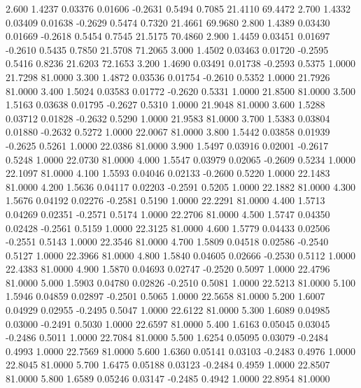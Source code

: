    2.600   1.4237   0.03376   0.01606  -0.2631   0.5494   0.7085  21.4110  69.4472
   2.700   1.4332   0.03409   0.01638  -0.2629   0.5474   0.7320  21.4661  69.9680
   2.800   1.4389   0.03430   0.01669  -0.2618   0.5454   0.7545  21.5175  70.4860
   2.900   1.4459   0.03451   0.01697  -0.2610   0.5435   0.7850  21.5708  71.2065
   3.000   1.4502   0.03463   0.01720  -0.2595   0.5416   0.8236  21.6203  72.1653
   3.200   1.4690   0.03491   0.01738  -0.2593   0.5375   1.0000  21.7298  81.0000
   3.300   1.4872   0.03536   0.01754  -0.2610   0.5352   1.0000  21.7926  81.0000
   3.400   1.5024   0.03583   0.01772  -0.2620   0.5331   1.0000  21.8500  81.0000
   3.500   1.5163   0.03638   0.01795  -0.2627   0.5310   1.0000  21.9048  81.0000
   3.600   1.5288   0.03712   0.01828  -0.2632   0.5290   1.0000  21.9583  81.0000
   3.700   1.5383   0.03804   0.01880  -0.2632   0.5272   1.0000  22.0067  81.0000
   3.800   1.5442   0.03858   0.01939  -0.2625   0.5261   1.0000  22.0386  81.0000
   3.900   1.5497   0.03916   0.02001  -0.2617   0.5248   1.0000  22.0730  81.0000
   4.000   1.5547   0.03979   0.02065  -0.2609   0.5234   1.0000  22.1097  81.0000
   4.100   1.5593   0.04046   0.02133  -0.2600   0.5220   1.0000  22.1483  81.0000
   4.200   1.5636   0.04117   0.02203  -0.2591   0.5205   1.0000  22.1882  81.0000
   4.300   1.5676   0.04192   0.02276  -0.2581   0.5190   1.0000  22.2291  81.0000
   4.400   1.5713   0.04269   0.02351  -0.2571   0.5174   1.0000  22.2706  81.0000
   4.500   1.5747   0.04350   0.02428  -0.2561   0.5159   1.0000  22.3125  81.0000
   4.600   1.5779   0.04433   0.02506  -0.2551   0.5143   1.0000  22.3546  81.0000
   4.700   1.5809   0.04518   0.02586  -0.2540   0.5127   1.0000  22.3966  81.0000
   4.800   1.5840   0.04605   0.02666  -0.2530   0.5112   1.0000  22.4383  81.0000
   4.900   1.5870   0.04693   0.02747  -0.2520   0.5097   1.0000  22.4796  81.0000
   5.000   1.5903   0.04780   0.02826  -0.2510   0.5081   1.0000  22.5213  81.0000
   5.100   1.5946   0.04859   0.02897  -0.2501   0.5065   1.0000  22.5658  81.0000
   5.200   1.6007   0.04929   0.02955  -0.2495   0.5047   1.0000  22.6122  81.0000
   5.300   1.6089   0.04985   0.03000  -0.2491   0.5030   1.0000  22.6597  81.0000
   5.400   1.6163   0.05045   0.03045  -0.2486   0.5011   1.0000  22.7084  81.0000
   5.500   1.6254   0.05095   0.03079  -0.2484   0.4993   1.0000  22.7569  81.0000
   5.600   1.6360   0.05141   0.03103  -0.2483   0.4976   1.0000  22.8045  81.0000
   5.700   1.6475   0.05188   0.03123  -0.2484   0.4959   1.0000  22.8507  81.0000
   5.800   1.6589   0.05246   0.03147  -0.2485   0.4942   1.0000  22.8954  81.0000
